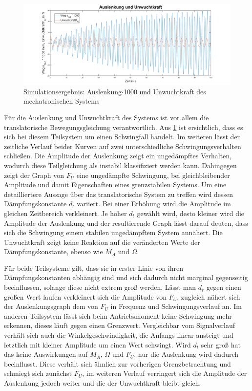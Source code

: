 \begin{figure}[hbt]
	\centering
	\includegraphics[width=1\linewidth]{Images/StreckeundUnwuchtkraft}
	\caption{Simulationsergebnis: Auslenkung$\cdot$1000 und Unwuchtkraft des mechatronischen Systems}
	\label{fig:StreckeundUnwuchtkraft}
\end{figure}

Für die Auslenkung und Unwuchtkraft des Systems ist vor allem die translatorische Bewegungsgleichung verantwortlich. Aus \ref{fig:StreckeundUnwuchtkraft} ist ersichtlich, dass es sich bei diesem Teilsystem um einen Schwingfall handelt. Im weiteren lässt der zeitliche Verlauf beider Kurven auf zwei unterschiedliche Schwingungsverhalten schließen. Die Amplitude der Auslenkung zeigt ein ungedämpftes Verhalten, wodurch diese Teilgleichung als instabil klassifiziert werden kann. Dahingegen zeigt der Graph von $F_U$ eine ungedämpfte Schwingung, bei gleichbleibender Amplitude und damit Eigenschaften eines grenzstabilen Systems. Um eine detailliertere Aussage über das translatorische System zu treffen wird dessen Dämpfungskonstante $d_t$ variiert. 
Bei einer Erhöhung wird die Amplitude im gleichen Zeitbereich verkleinert. Je höher $d_t$ gewählt wird, desto kleiner wird die Amplitude der Auslenkung und der resultierende Graph lässt darauf deuten, dass sich die Schwingung einem stabilen ungedämpftem System annähert. Die Unwuchtkraft zeigt keine Reaktion auf die veränderten Werte der Dämpfungskonstante, ebenso wie $M_A$ und $\Omega$.

Für beide Teilsysteme gilt, dass sie in erster Linie von ihren Dämpfungskonstanten abhängig sind und sich dadurch nicht marginal gegenseitig beeinflussen, solange diese nicht extrem groß werden. Lässt man $d_r$ gegen einen großen Wert laufen verkleinert sich die Amplitude von $F_U$, zugleich nähert sich der Auslenkungsgraph dem von $F_U$ in Frequenz und Schwingungsverlauf an. Im anderen Teilsystem lässt sich beim Antriebsmoment keine Schwingung mehr erkennen, dieses läuft gegen einen Grenzwert. Vergleichbar vom Signalverlauf verhält sich auch die Winkelgeschwindigkeit, die Anfangs linear ansteigt und letztlich mit kleiner Amplitude um einen Wert schwingt. Wird $d_t$ sehr groß hat das keine Auswirkungen auf $M_A$, $\Omega$ und $F_U$, nur die Auslenkung wird dadurch beeinflusst. Diese verhält sich ähnlich zur vorherigen Grenzbetrachtung und schmiegt sich zunächst $F_U$, im weiteren Verlauf verringert sich die Amplitude der Auslenkung jedoch weiter und die der Unwuchtkraft bleibt gleich.